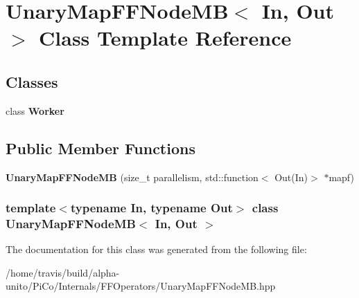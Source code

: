 \hypertarget{class_unary_map_f_f_node_m_b}{\section{\-Unary\-Map\-F\-F\-Node\-M\-B$<$ \-In, \-Out $>$ \-Class \-Template \-Reference}
\label{class_unary_map_f_f_node_m_b}
}
\subsection*{\-Classes}
\begin{DoxyCompactItemize}
\item 
class {\bfseries \-Worker}
\end{DoxyCompactItemize}
\subsection*{\-Public \-Member \-Functions}
\begin{DoxyCompactItemize}
\item 
\hypertarget{class_unary_map_f_f_node_m_b_ace4196fa8aa3ff3c5db4e6b66d931fc6}{{\bfseries \-Unary\-Map\-F\-F\-Node\-M\-B} (size\-\_\-t parallelism, std\-::function$<$ \-Out(\-In)$>$ $\ast$mapf)}\label{class_unary_map_f_f_node_m_b_ace4196fa8aa3ff3c5db4e6b66d931fc6}

\end{DoxyCompactItemize}
\subsubsection*{template$<$typename \-In, typename \-Out$>$ class Unary\-Map\-F\-F\-Node\-M\-B$<$ In, Out $>$}



\-The documentation for this class was generated from the following file\-:\begin{DoxyCompactItemize}
\item 
/home/travis/build/alpha-\/unito/\-Pi\-Co/\-Internals/\-F\-F\-Operators/\-Unary\-Map\-F\-F\-Node\-M\-B.\-hpp\end{DoxyCompactItemize}
